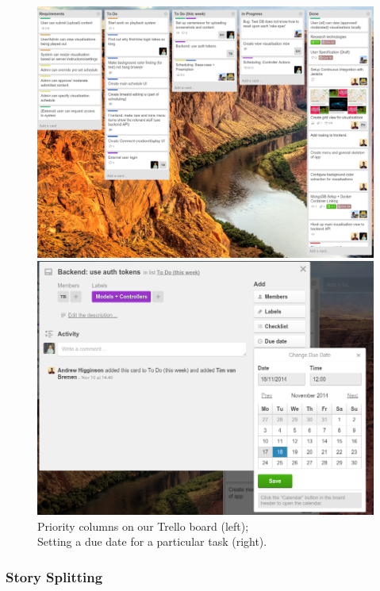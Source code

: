 \documentclass[a4paper, titlepage]{article}
\begin{document}
\begin{figure}[ht]
  \begin{minipage}{0.49\textwidth}
    \includegraphics[width = \textwidth]{./eval/trello-columns.png}
  \end{minipage}
  \begin{minipage}{0.49\textwidth}
    \includegraphics[width = \textwidth]{./eval/trello-due-date.png}
  \end{minipage}
  \caption{Priority columns on our Trello board (left); \\Setting a due date for a particular task (right).}
  \label{fig:eval_trello}
\end{figure}

\subsubsection{Story Splitting}
\end{document}
